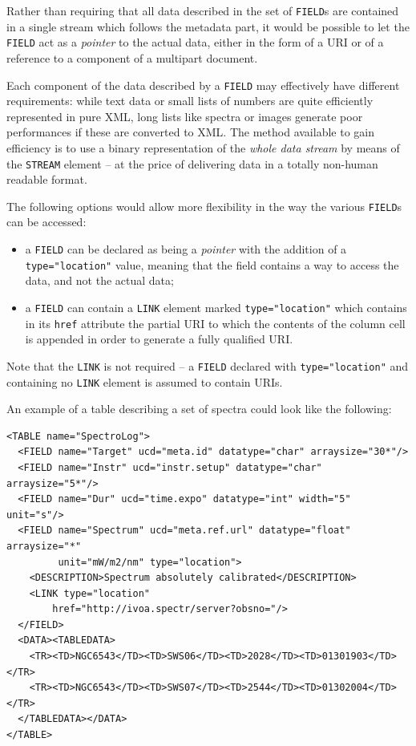 \documentclass[11pt,a4paper]{ivoa}
\let\fg=\color
\def\attr#1{{\tt{\fg{DarkRed}#1}}}
\def\elem#1{{\tt{\fg{DarkRed}#1}}}
\def\attrval#1#2{{\tt{\fg{DarkRed}#1}="{\fg{DarkPurple}#2}"}}
\begin{document}
{{{Rather than requiring that all data described in the set of \elem{FIELD}s
are contained in a single stream which follows the metadata part,
it would be possible to let the \elem{FIELD} act as
a {\em pointer} to the actual data, either in the form of a URI or of
a reference to a component of a multipart document.

Each component of the data described by a \elem{FIELD} may effectively
have different requirements: while text data or small lists of numbers
are quite efficiently represented in pure XML, long lists like spectra
or images generate poor performances if these are converted to XML.
The method available to gain efficiency is to use a
binary representation of the {\em whole data stream} by means of the
\elem{STREAM} element -- at the price of delivering data in a totally non-human
readable format.

The following options would allow more flexibility in the way the
various \elem{FIELD}s can be accessed:

\begin{itemize}
\item   a \elem{FIELD} can be declared as being a {\em pointer}
        with the addition of a \attrval{type}{location} value,
        meaning that the field contains a way to access the data,
        and not the actual data;
\item   a \elem{FIELD} can contain a \elem{LINK} element marked
        \attrval{type}{location} which contains in its
        \attr{href} attribute the partial URI to which the contents
        of the column cell is appended in order to generate a
        fully qualified URI.
\end{itemize}
Note that the \elem{LINK} is not required -- a \elem{FIELD} declared
with \attrval{type}{location} and containing no \elem{LINK} element
is assumed to contain URIs.

An example of a table describing a set of spectra could look like the following:

\small
\begin{verbatim}
<TABLE name="SpectroLog">
  <FIELD name="Target" ucd="meta.id" datatype="char" arraysize="30*"/>
  <FIELD name="Instr" ucd="instr.setup" datatype="char" arraysize="5*"/>
  <FIELD name="Dur" ucd="time.expo" datatype="int" width="5" unit="s"/>
  <FIELD name="Spectrum" ucd="meta.ref.url" datatype="float" arraysize="*"
         unit="mW/m2/nm" type="location">
    <DESCRIPTION>Spectrum absolutely calibrated</DESCRIPTION>
    <LINK type="location"
        href="http://ivoa.spectr/server?obsno="/>
  </FIELD>
  <DATA><TABLEDATA>
    <TR><TD>NGC6543</TD><TD>SWS06</TD><TD>2028</TD><TD>01301903</TD></TR>
    <TR><TD>NGC6543</TD><TD>SWS07</TD><TD>2544</TD><TD>01302004</TD></TR>
  </TABLEDATA></DATA>
</TABLE>
\end{verbatim}\normalsize

}}}
\end{document}
